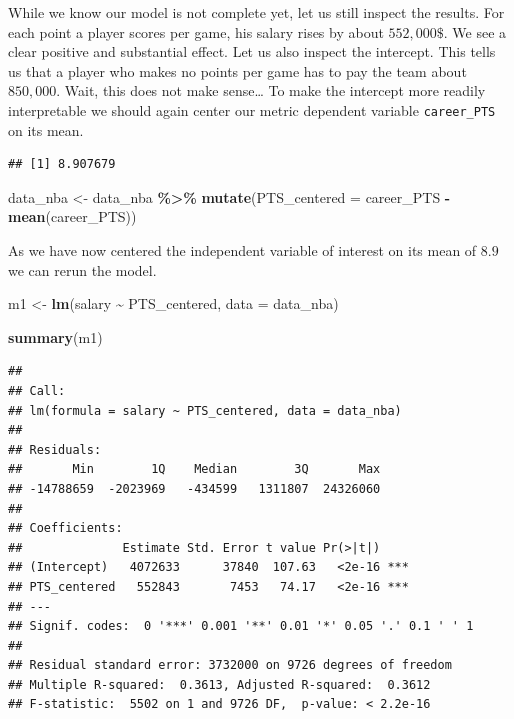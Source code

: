 \documentclass[
]{book}
\newenvironment{Shaded}{\begin{snugshade}}{\end{snugshade}}
\newcommand{\AttributeTok}[1]{\textcolor[rgb]{0.13,0.29,0.53}{#1}}
\newcommand{\FunctionTok}[1]{\textcolor[rgb]{0.13,0.29,0.53}{\textbf{#1}}}
\newcommand{\NormalTok}[1]{#1}
\newcommand{\OtherTok}[1]{\textcolor[rgb]{0.56,0.35,0.01}{#1}}
\newcommand{\SpecialCharTok}[1]{\textcolor[rgb]{0.81,0.36,0.00}{\textbf{#1}}}
\begin{document}
While we know our model is not complete yet, let us still inspect the
results. For each point a player scores per game, his salary rises by
about \(552,000\$\). We see a clear positive and substantial effect. Let
us also inspect the intercept. This tells us that a player who makes no
points per game has to pay the team about \(850,000\). Wait, this does not
make sense\ldots{} To make the intercept more readily interpretable we should
again center our metric dependent variable \texttt{career\_PTS} on its mean.

\begin{Shaded}
\end{Shaded}

\begin{verbatim}
## [1] 8.907679
\end{verbatim}

\begin{Shaded}
\begin{Highlighting}[]
\NormalTok{data\_nba }\OtherTok{\textless{}{-}}\NormalTok{ data\_nba }\SpecialCharTok{\%\textgreater{}\%} 
  \FunctionTok{mutate}\NormalTok{(}\AttributeTok{PTS\_centered =}\NormalTok{ career\_PTS }\SpecialCharTok{{-}} \FunctionTok{mean}\NormalTok{(career\_PTS))}
\end{Highlighting}
\end{Shaded}

As we have now centered the independent variable of interest on its mean
of \(8.9\) we can rerun the model.

\begin{Shaded}
\begin{Highlighting}[]
\NormalTok{m1 }\OtherTok{\textless{}{-}} \FunctionTok{lm}\NormalTok{(salary }\SpecialCharTok{\textasciitilde{}}\NormalTok{ PTS\_centered, }\AttributeTok{data =}\NormalTok{ data\_nba)}

\FunctionTok{summary}\NormalTok{(m1)}
\end{Highlighting}
\end{Shaded}

\begin{verbatim}
## 
## Call:
## lm(formula = salary ~ PTS_centered, data = data_nba)
## 
## Residuals:
##       Min        1Q    Median        3Q       Max 
## -14788659  -2023969   -434599   1311807  24326060 
## 
## Coefficients:
##              Estimate Std. Error t value Pr(>|t|)    
## (Intercept)   4072633      37840  107.63   <2e-16 ***
## PTS_centered   552843       7453   74.17   <2e-16 ***
## ---
## Signif. codes:  0 '***' 0.001 '**' 0.01 '*' 0.05 '.' 0.1 ' ' 1
## 
## Residual standard error: 3732000 on 9726 degrees of freedom
## Multiple R-squared:  0.3613, Adjusted R-squared:  0.3612 
## F-statistic:  5502 on 1 and 9726 DF,  p-value: < 2.2e-16
\end{verbatim}
\end{document}
